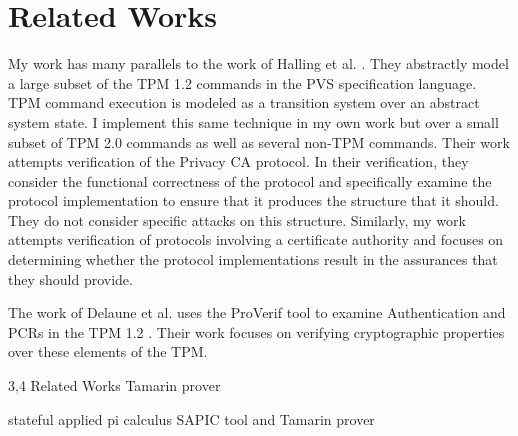 
\section{Related Works}



My work has many parallels to the work of Halling et al. \cite{TPM12Model,PrivacyCAAnalysis}.
They abstractly model a large subset of the TPM 1.2 commands in the PVS specification language. TPM command execution is modeled as a transition system over an abstract system state. I implement this same technique in my own work but over a small subset of TPM 2.0 commands as well as several non-TPM commands. Their work attempts verification of the Privacy CA protocol. In their verification, they consider the functional correctness of the protocol and specifically examine the protocol implementation to ensure that it produces the structure that it should. They do not consider specific attacks on this structure. Similarly, my work attempts verification of protocols involving a certificate authority and focuses on determining whether the protocol implementations result in the assurances that they should provide.

The work of Delaune et al. uses the ProVerif tool to examine  Authentication and PCRs in the TPM 1.2 
\cite{AuthAnalysis,PCRAnalysis}.
Their work focuses on verifying cryptographic properties over these elements of the TPM.


3,4
Related Works
\cite{DAAAnalysis} 
Tamarin prover

\cite{EAAnalysis} 
stateful applied pi calculus
SAPIC tool and Tamarin prover

\cite{HMACAnalysis}



